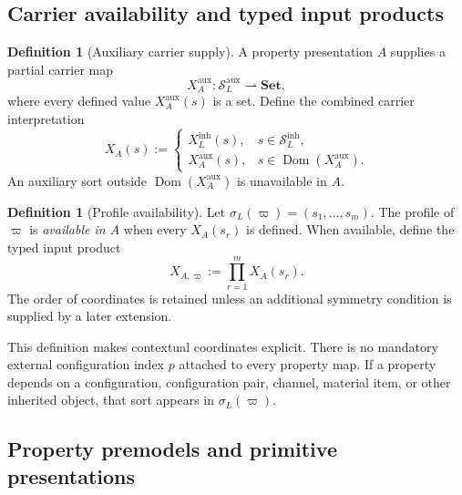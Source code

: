 \documentclass[11pt]{article}
\newcommand{\Sin}{\mathcal S_{L}^{\mathrm{inh}}}
\newcommand{\Saux}{\mathcal S_{L}^{\mathrm{aux}}}
\newcommand{\Dom}{\operatorname{Dom}}
\theoremstyle{definition}
\newtheorem{definition}[theorem]{Definition}
\theoremstyle{remark}
\begin{document}
\subsection{Carrier availability and typed input products}

\begin{definition}[Auxiliary carrier supply]
A property presentation \(A\) supplies a partial carrier map
\[
X_A^{\mathrm{aux}}:\Saux\rightharpoonup \mathbf{Set},
\]
where every defined value \(X_A^{\mathrm{aux}}(s)\) is a set.
Define the combined carrier interpretation
\[
X_A(s):=
\begin{cases}
X_L^{\mathrm{inh}}(s), & s\in\Sin,\\
X_A^{\mathrm{aux}}(s), & s\in\Dom(X_A^{\mathrm{aux}}).
\end{cases}
\]
An auxiliary sort outside \(\Dom(X_A^{\mathrm{aux}})\) is unavailable in \(A\).
\end{definition}

\begin{definition}[Profile availability]
Let \(\sigma_L(\varpi)=(s_1,\ldots,s_m)\).
The profile of \(\varpi\) is \emph{available in \(A\)} when every \(X_A(s_r)\) is defined.
When available, define the typed input product
\[
X_{A,\varpi}:=\prod_{r=1}^{m}X_A(s_r).
\]
The order of coordinates is retained unless an additional symmetry condition is supplied by a later extension.
\end{definition}

This definition makes contextual coordinates explicit.
There is no mandatory external configuration index \(p\) attached to every property map.
If a property depends on a configuration, configuration pair, channel, material item, or other inherited object, that sort appears in \(\sigma_L(\varpi)\).

\subsection{Property premodels and primitive presentations}
\end{document}
